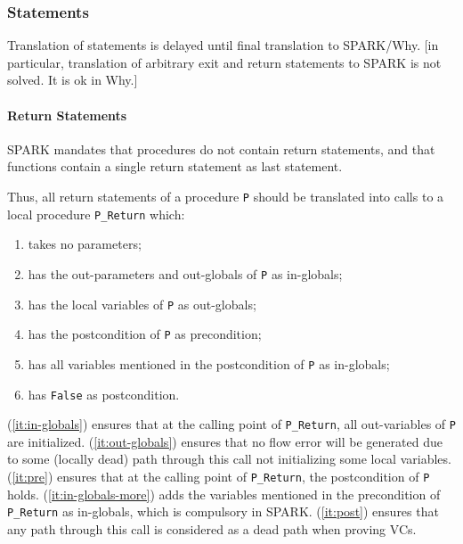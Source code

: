 \documentclass{article}
\begin{document}
\subsubsection{Statements}

Translation of statements is delayed until final translation to SPARK/Why. [in
particular, translation of arbitrary exit and return statements to SPARK is not
solved. It is ok in Why.]

\paragraph{Return Statements} 

SPARK mandates that procedures do not contain return statements, and that
functions contain a single return statement as last statement. 

Thus, all return
statements of a procedure \verb|P| should be translated into calls to a local
procedure \verb|P_Return| which:
\begin{enumerate}
\item \label{it:no-param} takes no parameters;
\item \label{it:in-globals} has the out-parameters and out-globals of \verb|P|
  as in-globals;
\item \label{it:out-globals} has the local variables of \verb|P| as out-globals;
\item \label{it:pre} has the postcondition of \verb|P| as precondition;
\item \label{it:in-globals-more} has all variables mentioned in the
  postcondition of \verb|P| as in-globals;
\item \label{it:post} has \verb|False| as postcondition.
\end{enumerate}
(\ref{it:in-globals}) ensures that at the calling point of \verb|P_Return|, all
out-variables of \verb|P| are initialized. (\ref{it:out-globals}) ensures that
no flow error will be generated due to some (locally dead) path through this
call not initializing some local variables. (\ref{it:pre}) ensures that at the
calling point of \verb|P_Return|, the postcondition of \verb|P|
holds. (\ref{it:in-globals-more}) adds the variables mentioned in the
precondition of \verb|P_Return| as in-globals, which is compulsory in SPARK.
(\ref{it:post}) ensures that any path through this call is considered as a dead
path when proving VCs.
\end{document}
